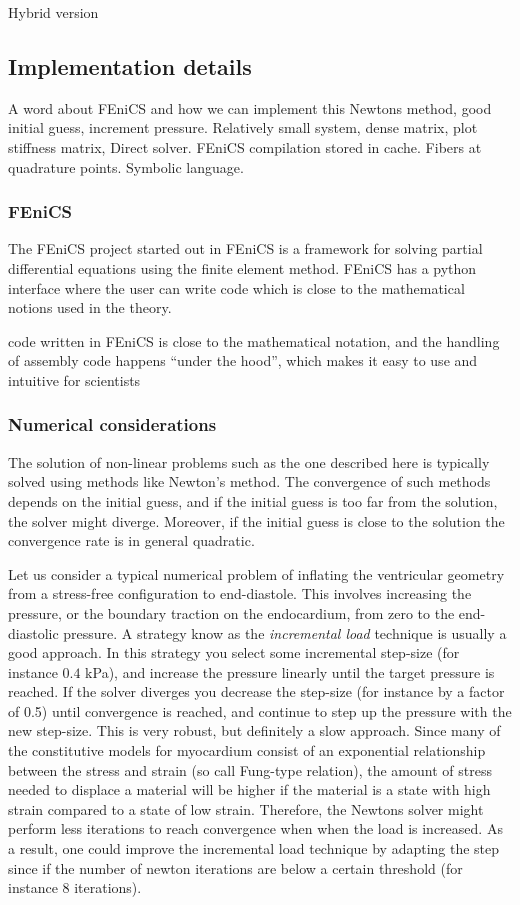 Hybrid version \cite{goktepe2014generalized}




\subsection{Implementation details}
A word about FEniCS and how we can implement this
Newtons method, good initial guess, increment pressure.
Relatively small system, dense matrix, plot stiffness matrix, Direct
solver.
FEniCS compilation stored in cache.
Fibers at quadrature points. Symbolic language.

\subsubsection{FEniCS}
The FEniCS project started out in 
FEniCS is a framework for solving partial differential
equations using the finite element method. FEniCS has a python
interface where the user can write code which is close to the
mathematical notions used in the theory.

code written in
FEniCS is close to the mathematical notation, and the handling of
assembly code happens ``under the hood'', which makes it easy to use
and intuitive for scientists 

\subsubsection{Numerical considerations}
The solution of non-linear problems such as the one described here is
typically solved using methods like Newton's method. The convergence of
such methods depends on the initial guess, and if the
initial guess is too far from the solution, the solver might diverge.
Moreover, if the initial guess is close to the solution the
convergence rate is in general quadratic.

Let us consider a
typical numerical problem of inflating the ventricular geometry from a
stress-free configuration to end-diastole. This involves increasing
the pressure, or the boundary traction on the endocardium, from zero
to the end-diastolic pressure. A strategy know as the
\emph{incremental load} technique is usually a good approach. In this
strategy you select some incremental step-size (for instance $0.4$
kPa), and increase the pressure linearly until the target pressure is
reached. If the solver diverges you decrease the step-size (for
instance by a factor of 0.5) until convergence is reached, and
continue to step up the pressure with the new step-size. This is very
robust, but definitely a slow approach. Since many of the 
constitutive models for myocardium consist of an exponential
relationship between the stress and strain (so call Fung-type
relation), the amount of stress needed to displace a material will be
higher if the material is a state with high strain compared to a state
of low strain. Therefore, the Newtons solver might perform less
iterations to reach convergence when when the load is increased. As a
result, one could improve the incremental load technique by adapting
the step since if the number of newton iterations are below a certain
threshold (for instance $8$ iterations).

